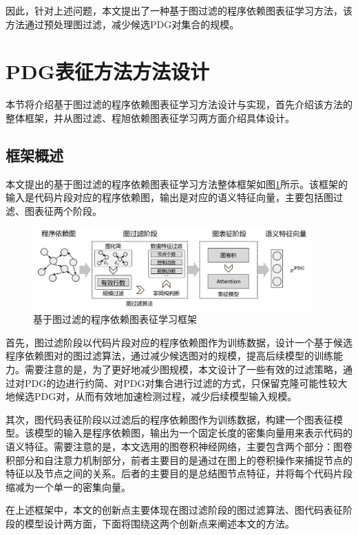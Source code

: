 因此，针对上述问题，本文提出了一种基于图过滤的程序依赖图表征学习方法，该方法通过预处理图过滤，减少候选PDG对集合的规模。

\section{PDG表征方法方法设计}
\label{sec:PDG}
本节将介绍基于图过滤的程序依赖图表征学习方法设计与实现，首先介绍该方法的整体框架，并从图过滤、程旭依赖图表征学习两方面介绍具体设计。 

\subsection{框架概述}
\label{subsec:PDGOverview}
本文提出的基于图过滤的程序依赖图表征学习方法整体框架如图\ref{fig:pdgframework}所示。该框架的输入是代码片段对应的程序依赖图，输出是对应的语义特征向量，主要包括图过滤、图表征两个阶段。

\begin{figure}[H]
  \centering
  \includegraphics[width=0.95\textwidth]{figures/pdgframework.png}
  \caption{基于图过滤的程序依赖图表征学习框架}\label{fig:pdgframework}
\end{figure}

首先，图过滤阶段以代码片段对应的程序依赖图作为训练数据，设计一个基于候选程序依赖图对的图过滤算法，通过减少候选图对的规模，提高后续模型的训练能力。需要注意的是，为了更好地减少图规模，本文设计了一些有效的过滤策略，通过对PDG的边进行约简、对PDG对集合进行过滤的方式，只保留克隆可能性较大地候选PDG对，从而有效地加速检测过程，减少后续模型输入规模。

其次，图代码表征阶段以过滤后的程序依赖图作为训练数据，构建一个图表征模型。该模型的输入是程序依赖图，输出为一个固定长度的密集向量用来表示代码的语义特征。需要注意的是，本文选用的图卷积神经网络，主要包含两个部分：图卷积部分和自注意力机制部分，前者主要目的是通过在图上的卷积操作来捕捉节点的特征以及节点之间的关系。后者的主要目的是总结图节点特征，并将每个代码片段缩减为一个单一的密集向量。

在上述框架中，本文的创新点主要体现在图过滤阶段的图过滤算法、图代码表征阶段的模型设计两方面，下面将围绕这两个创新点来阐述本文的方法。


